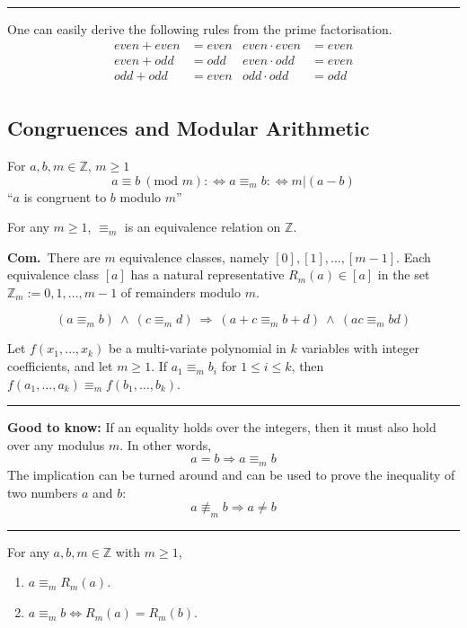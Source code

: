 \documentclass[a4paper]{extarticle}
\newcommand{\Com}{\textbf{Com.}\ }
\newcommand{\Z}{\mathbb{Z}}
\newcommand{\sep}{\vspace{5pt}\noindent\hrule\vspace{5pt}}
\begin{document}
\begin{multicols*}{2}
\sep

One can easily derive the following rules from the prime factorisation.
\begin{align*}
even + even &= even  &  even \cdot even &= even \\
even + odd  &= odd   &  even \cdot odd  &= even \\
odd  + odd  &= even  &  odd  \cdot odd  &= odd  \\
\end{align*}

\subsection{Congruences and Modular Arithmetic}

\Def[Congruence] For $a,b,m\in\Z$, $m\geq 1$
\[
a\equiv b\ (\text{mod }  m)
:\Longleftrightarrow
a\equiv_m b
:\Longleftrightarrow
m|(a-b)
\]
``$a$ is congruent to $b$ modulo $m$''

\Lem For any $m\geq 1$, $\equiv_m$ is an equivalence relation on $\Z$.

\Com There are $m$ equivalence classes, namely $[0],[1],\ldots,[m-1]$. Each
equivalence class $[a]$ has a natural representative $R_m(a)\in[a]$ in the set
$\Z_m:={0,1,\ldots,m-1}$ of remainders modulo $m$.

\[
(a\equiv_m b) \ \land \ (c\equiv_m d) 
\ \Longrightarrow \ 
(a+c\equiv_m b+d) \ \land \ (ac\equiv_m bd)
\]

\Cor Let $f(x_1,\ldots,x_k)$ be a multi-variate polynomial in $k$
variables with integer coefficients, and let $m\geq 1$. If $a_1\equiv_m b_i$
for $1\leq i\leq k$, then $f(a_1,\ldots,a_k)\equiv_m f(b_1,\ldots,b_k)$. 

\sep

\textbf{Good to know:}
If an equality holds over the integers, then it must also hold over any modulus
$m$. In other words,
\[
a=b \Longrightarrow a\equiv_m b
\]
The implication can be turned around and can be used to prove the inequality of
two numbers $a$ and $b$:
\[
a\not\equiv_m b \Longrightarrow a\neq b
\]

\sep

\Lem For any $a,b,m \in \Z$ with $m\geq 1$,
\begin{enumerate}[label=(\roman*)]
  \item $a\equiv_m R_m(a)$.
  \item $a\equiv_m b \Longleftrightarrow R_m(a) = R_m(b)$.
\end{enumerate}


\end{multicols*}
\end{document}
